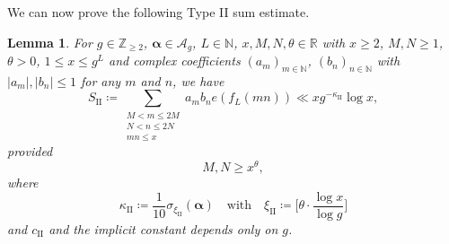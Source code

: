 \documentclass[hidelinks]{amsart}
\numberwithin{equation}{section}
\theoremstyle{plain}
\newtheorem{lemma}{Lemma}
\theoremstyle{definition}
\begin{document}
We can now prove the following Type II sum estimate.
\begin{lemma}
\label{lem:TypeII}
For $g\in\mathbb{Z}_{\ge2}$, $\bm{\alpha}\in\mathscr{A}_{g}$, $L\in\mathbb{N}$, $x,M,N,\theta\in\mathbb{R}$ with
$x\ge2$, $M,N\ge 1$, $\theta>0$, $1\le x\le g^{L}$
and complex coefficients $(a_{m})_{m\in\mathbb{N}}$, $(b_{n})_{n\in\mathbb{N}}$
with $|a_{m}|,|b_{n}|\le1$ for any $m$ and $n$, we have
\[
S_{\mathrm{II}}
\coloneqq
\sum_{\substack{
M<m\le 2M\\
N<n\le 2N\\
mn\le x}}
a_{m}b_{n}
e(f_{L}(mn))
\ll
xg^{-\kappa_{\mathrm{II}}}\log x,
\]
provided
\begin{equation}
\label{lem:TypeII:MN_range}
M,N\ge x^{\theta},
\end{equation}
where
\begin{equation}
\label{lem:TypeII:def:kappa}
\kappa_{\mathrm{II}}
\coloneqq
\frac{1}{10}
\sigma_{\xi_{\mathrm{II}}}(\bm{\alpha})
\quad\text{with}\quad
\xi_{\mathrm{II}}
\coloneqq
\biggl[\theta\cdot\frac{\log x}{\log g}\biggr]
\end{equation}
and $c_{\mathrm{II}}$ and the implicit constant depends only on $g$.
\end{lemma}
\end{document}
